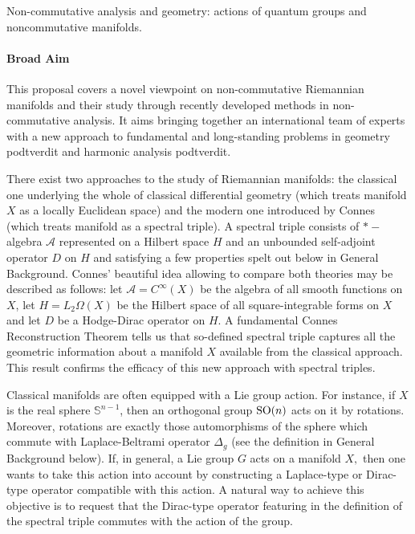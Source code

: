 \documentclass{article}
\newcommand{\archeading}[1]{\vspace{.3cm} \noindent{\bfseries #1} \vspace{.1cm}   }
\begin{document}
\parindent=20pt
\pagestyle{empty}
\newpage


\archeading{Project Title} Non-commutative analysis and geometry: actions of quantum groups and noncommutative manifolds.

\bigskip\archeading{Aims and Background}

\paragraph*{Broad Aim} This proposal covers a novel viewpoint on non-commutative Riemannian manifolds and their study through recently developed methods in non-commutative analysis. It aims bringing together an international team of experts with a new approach to fundamental and long-standing problems in geometry {\color{red} podtverdit} and harmonic analysis {\color{red} podtverdit}.

There exist two approaches to the study of Riemannian manifolds: the classical one underlying the whole of classical differential geometry (which treats manifold $X$ as a locally Euclidean space) and the modern one introduced by Connes (which treats manifold as a spectral triple).  A spectral triple consists of $\ast-$algebra $\mathcal{A}$ represented on a Hilbert space $H$ and an unbounded self-adjoint operator $D$ on $H$ and satisfying a few properties spelt out below in General Background. Connes' beautiful idea \cite{Connes-book} allowing to compare both theories may be described as follows: let  $\mathcal{A}=C^{\infty}(X)$ be the algebra of all smooth functions on $X$, let $H=L_2\Omega(X)$ be the Hilbert space of all square-integrable forms on $X$ and let $D$ be a Hodge-Dirac operator \cite{BGV} on $H$. A fundamental Connes Reconstruction Theorem \cite{Connes-reconstruction} tells us that so-defined spectral triple captures all the geometric information about a manifold $X$ available from the classical approach. This result confirms the efficacy of this new approach with spectral triples.

Classical manifolds are often equipped with a Lie group action. For instance, if $X$ is the real sphere $\mathbb{S}^{n-1}$, then an orthogonal group ${\rm SO}(n)$ acts on it by rotations. Moreover, rotations are exactly those automorphisms of the sphere which commute with Laplace-Beltrami operator $\Delta_g$ (see the definition in General Background below). If, in general, a Lie group $G$ acts on a manifold $X,$ then one wants to take this action into account by constructing a Laplace-type or Dirac-type operator compatible with this action. A natural way to achieve this objective is to request that the Dirac-type operator featuring in the definition of the spectral triple commutes with the action of the group.
\end{document}
